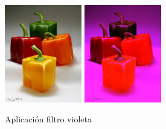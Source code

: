 \vskip0.3cm
\begin{figure}[H]
 \centering
  \includegraphics[width=0.3\textwidth]{imagenes/pimientos.jpg}
  \includegraphics[width=0.3\textwidth]{imagenes/pimientosVioleta.jpg}
 \caption{Aplicación filtro violeta}
 \label{diseño}
 \end{figure} 
 
